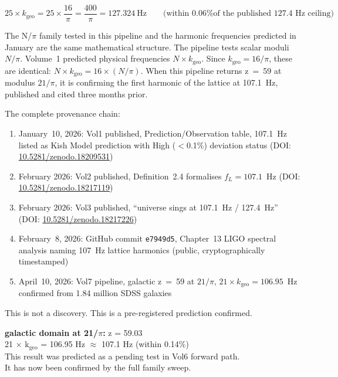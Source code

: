 \documentclass[11pt, letterpaper, openany]{book}
\begin{document}
\[
25 \times k_\text{geo} = 25 \times \frac{16}{\pi} = \frac{400}{\pi} = 127.324\ \text{Hz}
\qquad \text{(within 0.06\% of the published 127.4~Hz ceiling)}
\]

The N/$\pi$ family tested in this pipeline and the harmonic frequencies predicted in
January are the same mathematical structure. The pipeline tests scalar moduli $N/\pi$.
Volume~1 predicted physical frequencies $N \times k_\text{geo}$. Since $k_\text{geo}
= 16/\pi$, these are identical: $N \times k_\text{geo} = 16 \times (N/\pi)$. When
this pipeline returns z~=~59 at modulus $21/\pi$, it is confirming the first harmonic
of the lattice at 107.1~Hz, published and cited three months prior.

The complete provenance chain:

\begin{enumerate}
\item January~10, 2026: Vol1 published, Prediction/Observation table, 107.1~Hz listed
      as Kish Model prediction with High ($<$0.1\%) deviation status
      (DOI: \href{https://doi.org/10.5281/zenodo.18209531}{10.5281/zenodo.18209531})
\item February 2026: Vol2 published, Definition~2.4 formalises $f_L = 107.1$~Hz
      (DOI: \href{https://doi.org/10.5281/zenodo.18217119}{10.5281/zenodo.18217119})
\item February 2026: Vol3 published, ``universe sings at 107.1~Hz / 127.4~Hz''
      (DOI: \href{https://doi.org/10.5281/zenodo.18217226}{10.5281/zenodo.18217226})
\item February~8, 2026: GitHub commit \texttt{e7949d5}, Chapter~13 LIGO spectral
      analysis naming 107~Hz lattice harmonics (public, cryptographically timestamped)
\item April~10, 2026: Vol7 pipeline, galactic z~=~59 at $21/\pi$,
      $21 \times k_\text{geo} = 106.95$~Hz confirmed from 1.84 million SDSS galaxies
\end{enumerate}

This is not a discovery. This is a pre-registered prediction confirmed.

\begin{signalbox}
\textbf{galactic domain at 21/$\pi$:} z = 59.03 \\
21 $\times$ k$_\text{geo}$ = 106.95 Hz $\approx$ 107.1 Hz (within 0.14\%) \\
This result was predicted as a pending test in Vol6 forward path. \\
It has now been confirmed by the full family sweep.
\end{signalbox}
\end{document}
